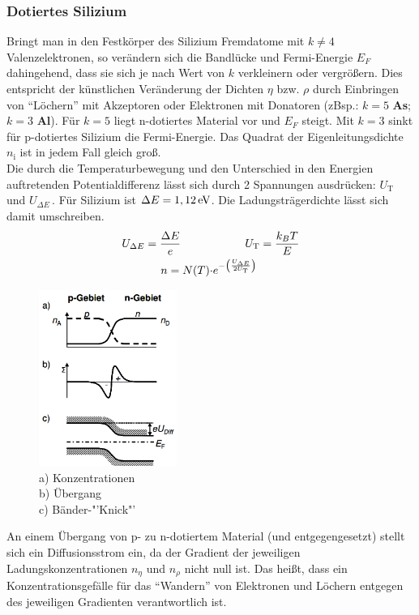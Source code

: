 \documentclass[numbers=noenddot,12pt,a4paper]{scrartcl}
\newcommand{\ix}[1]{_\text{#1}}
\newcommand{\euler}{\mathnormal{e}}
\newcommand{\fett}[1]{\textbf{#1}}
\begin{document}
\subsubsection{Dotiertes Silizium}
Bringt man in den Festkörper des Silizium Fremdatome mit $k\neq4$ Valenzelektronen, so verändern sich die Bandlücke und Fermi-Energie $E_F$ dahingehend, dass sie sich je nach Wert von $k$ verkleinern oder vergrößern. Dies entspricht der künstlichen Veränderung der Dichten $\eta$ bzw. $\rho$ durch Einbringen von "`Löchern"' mit Akzeptoren oder Elektronen mit Donatoren (zBsp.: $k=5$ \fett{As}; $k=3$ \fett{Al}). Für $k=5$ liegt n-dotiertes Material vor und $E_F$ steigt. Mit $k=3$ sinkt für p-dotiertes Silizium  die Fermi-Energie. Das Quadrat der Eigenleitungsdichte $n\ix{i}$ ist in jedem Fall gleich groß. \\
Die durch die Temperaturbewegung und den Unterschied in den Energien auftretenden Potentialdifferenz lässt sich durch 2 Spannungen ausdrücken: $U\ix{T}$ und $U_{\Delta E}\,$. Für Silizium ist $\Delta E=\unit[1,12]{eV}$. Die Ladungsträgerdichte lässt sich damit umschreiben.
\begin{align*}
		U_{\Delta E}=\frac{\Delta E}{e} \hspace{1cm}&\hspace{1cm} U\ix{T}=\frac{k_B T}{E} \\
		n=N(T)\cdot &\euler^{-\left(\frac{U_{\Delta E}}{2 U\ix{T}}\right)}
\end{align*}
\begin{figure}
	\centering
	\includegraphics[width=0.4\textwidth]{sigma.png}
	\caption{a) Konzentrationen\\ b) Übergang\\ c) Bänder-"'Knick"'} \label{img:sigma}
\end{figure}
An einem Übergang von p- zu n-dotiertem Material (und entgegengesetzt) stellt sich ein Diffusionsstrom ein, da der Gradient der jeweiligen Ladungskonzentrationen $n_{\eta}$ und $n_\rho$ nicht null ist. Das heißt, dass ein Konzentrationsgefälle für das "`Wandern"' von Elektronen und Löchern entgegen des jeweiligen Gradienten verantwortlich ist. \\
\end{document}
